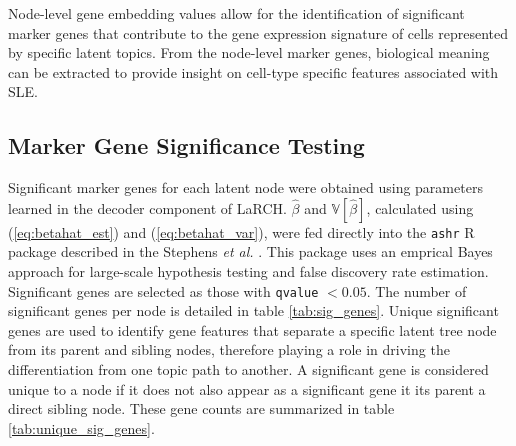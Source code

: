 Node-level gene embedding values allow for the identification of significant marker genes that contribute to the gene expression signature of cells represented by specific latent topics. From the node-level marker genes, biological meaning can be extracted to provide insight on cell-type specific features associated with SLE.

\subsection{Marker Gene Significance Testing}

Significant marker genes for each latent node were obtained using  parameters learned in the decoder component of LaRCH. $\hat{\beta}$ and $\mathbb{V}[\hat{\beta}]$, calculated using (\ref{eq:betahat_est}) and (\ref{eq:betahat_var}), were fed directly into the \texttt{ashr} R package described in the Stephens \textit{et al.} \cite{ashr}. This package uses an emprical Bayes approach for large-scale hypothesis testing and false discovery rate estimation. Significant genes are selected as those with \texttt{qvalue} $< 0.05$. The number of significant genes per node is detailed in table \ref{tab:sig_genes}. Unique significant genes are used to identify gene features that separate a specific latent tree node from its parent and sibling nodes, therefore playing a role in driving the differentiation from one topic path to another. A significant gene is considered unique to a node if it does not also appear as a significant gene it its parent a direct sibling node. These gene counts are summarized in table \ref{tab:unique_sig_genes}.


